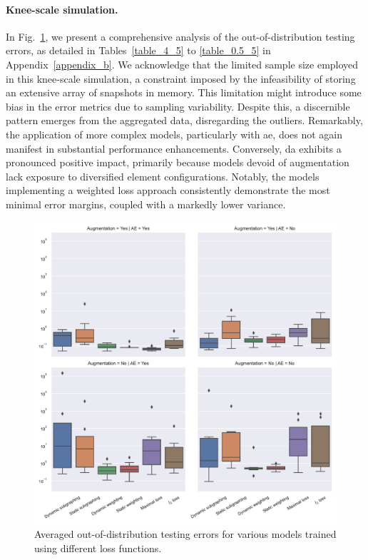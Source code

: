 \paragraph{Knee-scale simulation.} In Fig.~\ref{fig:3d_boxplot}, we present a comprehensive analysis of the out-of-distribution testing errors, as detailed in Tables~\ref{table_4_5} to \ref{table_0.5_5} in Appendix~\ref{appendix_b}. We acknowledge that the limited sample size employed in this knee-scale simulation, a constraint imposed by the infeasibility of storing an extensive array of snapshots in memory. This limitation might introduce some bias in the error metrics due to sampling variability. Despite this, a discernible pattern emerges from the aggregated data, disregarding the outliers. Remarkably, the application of more complex models, particularly with \ac{ae}, does not again manifest in substantial performance enhancements. Conversely, \ac{da} exhibits a pronounced positive impact, primarily because models devoid of augmentation lack exposure to diversified element configurations. Notably, the models implementing a weighted loss approach consistently demonstrate the most minimal error margins, coupled with a markedly lower variance.
%
\begin{figure}[t!]\centering
\includegraphics[width=1\linewidth,keepaspectratio]{3d_boxplot.pdf}
\caption{Averaged out-of-distribution testing errors for various models trained using different loss functions.}\label{fig:3d_boxplot}
\end{figure}

